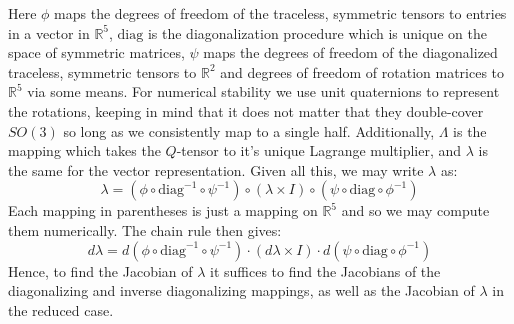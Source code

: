 \documentclass[reqno]{article}
\begin{document}
  \begin{figure}[h]
    \centering
  \end{figure}
  Here $\phi$ maps the degrees of freedom of the traceless, symmetric
  tensors to entries in a vector in $\mathbb{R}^5$, $\text{diag}$ is the
  diagonalization procedure which is unique on the space of symmetric matrices,
  $\psi$ maps the degrees of freedom of the diagonalized traceless, symmetric
  tensors to $\mathbb{R}^2$ and degrees of freedom of rotation matrices to
  $\mathbb{R}^5$ via some means.
  For numerical stability we use unit quaternions to represent the rotations, keeping
  in mind that it does not matter that they double-cover $SO(3)$ so long as we
  consistently map to a single half.
  Additionally, $\Lambda$ is the mapping which takes the $Q$-tensor to it's
  unique Lagrange multiplier, and $\lambda$ is the same for the vector
  representation.
  Given all this, we may write $\lambda$ as:
  \begin{equation}
    \lambda
    =
    \left( \phi \circ \text{diag}^{-1} \circ \psi^{-1} \right) \circ
    \left( \lambda \times I \right) \circ
    \left( \psi \circ \text{diag} \circ \phi^{-1} \right)
  \end{equation}
  Each mapping in parentheses is just a mapping on $\mathbb{R}^5$ and so we may
  compute them numerically.
  The chain rule then gives:
  \begin{equation}
    d \lambda
    =
    d\left( \phi \circ \text{diag}^{-1} \circ \psi^{-1} \right)
    \cdot \left( d\lambda \times I \right)
    \cdot d\left( \psi \circ \text{diag} \circ \phi^{-1} \right)
  \end{equation}
  Hence, to find the Jacobian of $\lambda$ it suffices to find the Jacobians of
  the diagonalizing and inverse diagonalizing mappings, as well as the Jacobian
  of $\lambda$ in the reduced case.
  
\end{document}
